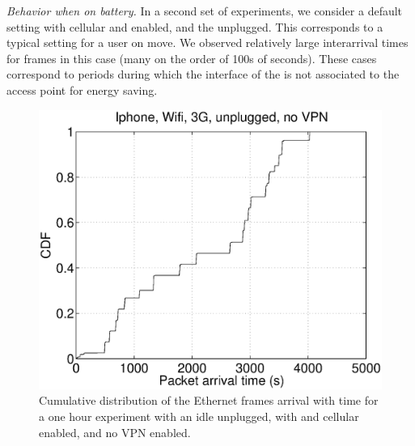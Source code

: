 


\noindent\emph{Behavior when on battery.} 
In a second set of experiments, we consider a default \iphone{}
setting with cellular and \wifi{} enabled, and the \iphone{} unplugged. This
corresponds to a typical setting for a user on move.  We observed 
relatively large interarrival times for frames in this case (many on the order of 100s of 
seconds). These cases correspond to
periods during which the \wifi interface of the \iphone{} is not
associated to the access point for energy saving. 



\begin{figure}
\centering
        \includegraphics[width=0.8\linewidth]{../../code/pushNotification/Fig/bw_iphone_wifi_3g_unplug_novpn_ts.eps}
  \caption{Cumulative distribution of the Ethernet frames
          arrival with time for a one hour experiment with an idle
          \iphone{} unplugged, with \wifi{} and cellular enabled, and no VPN
          enabled.}
  \label{fig:push_w3_ts}
\end{figure}


